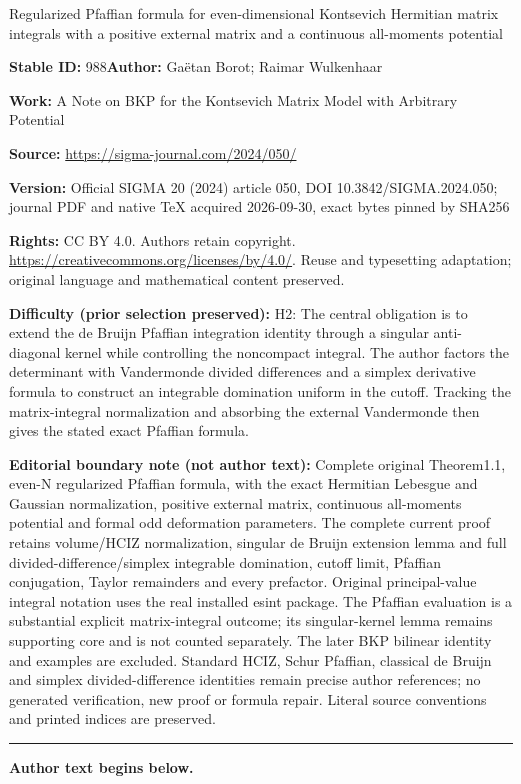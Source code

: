 \documentclass[11pt]{article}
\numberwithin{equation}{section}
\numberwithin{equation}{section}
\begin{document}
\begin{center}\Large Regularized Pfaffian formula for even-dimensional Kontsevich Hermitian matrix integrals with a positive external matrix and a continuous all-moments potential\end{center}
\noindent\textbf{Stable ID:} 988\quad\textbf{Author:} Gaëtan Borot; Raimar Wulkenhaar\par
\noindent\textbf{Work:} A Note on BKP for the Kontsevich Matrix Model with Arbitrary Potential\par
\noindent\textbf{Source:} \url{https://sigma-journal.com/2024/050/}\par
\noindent\textbf{Version:} Official SIGMA 20 (2024) article 050, DOI 10.3842/SIGMA.2024.050; journal PDF and native TeX acquired 2026-09-30, exact bytes pinned by SHA256\par
\noindent\textbf{Rights:} CC BY 4.0. Authors retain copyright. \url{https://creativecommons.org/licenses/by/4.0/}. Reuse and typesetting adaptation; original language and mathematical content preserved.\par
\noindent\textbf{Difficulty (prior selection preserved):} {\CJKfont H2: The central obligation is to extend the de Bruijn Pfaffian integration identity through a singular anti-diagonal kernel while controlling the noncompact integral. The author factors the determinant with Vandermonde divided differences and a simplex derivative formula to construct an integrable domination uniform in the cutoff. Tracking the matrix-integral normalization and absorbing the external Vandermonde then gives the stated exact Pfaffian formula.}\par
\medskip\noindent\textbf{Editorial boundary note (not author text):} Complete original Theorem1.1, even-N regularized Pfaffian formula, with the exact Hermitian Lebesgue and Gaussian normalization, positive external matrix, continuous all-moments potential and formal odd deformation parameters. The complete current proof retains volume/HCIZ normalization, singular de Bruijn extension lemma and full divided-difference/simplex integrable domination, cutoff limit, Pfaffian conjugation, Taylor remainders and every prefactor. Original principal-value integral notation uses the real installed esint package. The Pfaffian evaluation is a substantial explicit matrix-integral outcome; its singular-kernel lemma remains supporting core and is not counted separately. The later BKP bilinear identity and examples are excluded. Standard HCIZ, Schur Pfaffian, classical de Bruijn and simplex divided-difference identities remain precise author references; no generated verification, new proof or formula repair. Literal source conventions and printed indices are preserved.\par
\medskip\hrule\medskip\noindent\textbf{Author text begins below.}\par
\end{document}
